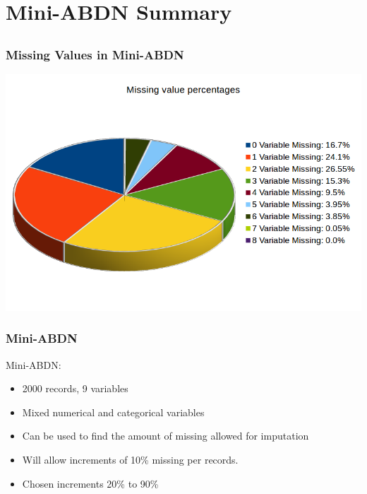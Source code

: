 \documentclass{beamer}
\begin{document}
\section{Mini-ABDN Summary}
\subsection{}

\begin{frame}
\frametitle{Missing Values in Mini-ABDN}
\centerline{\includegraphics[width=\paperwidth]{missing-perc-equal}}
\end{frame}


\begin{frame}
  \frametitle{Mini-ABDN}
  Mini-ABDN:
  \begin{itemize}
    \item 2000 records, 9 variables
    \item Mixed numerical and categorical variables 
    \item Can be used to find the amount of missing allowed for imputation
    \item Will allow increments of 10\% missing per records. 
    \item Chosen increments 20\% to 90\%
  \end{itemize}
\end{frame}
\end{document}
